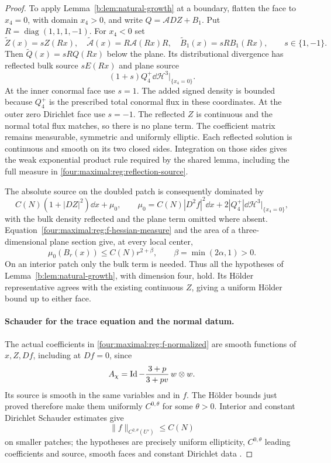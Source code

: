 \begin{proof}
To apply Lemma~\ref{b:lem:natural-growth} at a boundary, flatten the
face to $x_4=0$, with domain $x_4>0$, and write
$Q=\mathcal A DZ+B_1$.  Put $R=\operatorname{diag}(1,1,1,-1)$.
For $x_4<0$ set
\[
 \widetilde Z(x)=sZ(Rx),\quad
 \widetilde{\mathcal A}(x)=R\mathcal A(Rx)R,\quad
 \widetilde B_1(x)=sRB_1(Rx),\qquad s\in\{1,-1\}.
\]
Then $\widetilde Q(x)=sRQ(Rx)$ below the plane.  Its distributional
divergence has reflected bulk source $sE(Rx)$ and plane source
\begin{equation}\label{four:maximal:reg:reflection-source}
 (1+s)Q_4^+\dd\mathcal H^3\big|_{\{x_4=0\}}.
\end{equation}
At the inner conormal face use $s=1$.  The added signed density is
bounded because $Q_4^+$ is the prescribed total conormal flux in
these coordinates.  At the outer zero Dirichlet face use $s=-1$.
The reflected $Z$ is continuous and the normal total flux matches,
so there is no plane term.  The coefficient matrix remains measurable,
symmetric and uniformly elliptic.  Each reflected solution is continuous
and smooth on its two closed sides.  Integration on those sides gives
the weak exponential product rule required by the shared lemma,
including the full measure in \eqref{four:maximal:reg:reflection-source}.

The absolute source on the doubled patch is consequently dominated by
\[
 C(N)(1+|DZ|^2)\dd x+\mu _0,\qquad
 \mu _0=C(N)|D^2f|^2\dd x
          +2|Q_4^+|\dd\mathcal H^3\big|_{\{x_4=0\}},
\]
with the bulk density reflected and the plane term omitted where absent.
Equation~\eqref{four:maximal:reg:f-hessian-measure} and the area of a
three-dimensional plane section give, at every local center,
\[
 \mu _0(B_r(x))\le C(N)r^{2+\beta},\qquad
                         \beta=\min(2\alpha,1)>0.
\]
On an interior patch only the bulk term is needed.  Thus all the
hypotheses of Lemma~\ref{b:lem:natural-growth}, with dimension four,
hold.  Its H\"older representative agrees with the existing continuous
$Z$, giving a uniform H\"older bound up to either face.

\paragraph{Schauder for the trace equation and the normal datum.}
The actual coefficients in \eqref{four:maximal:reg:f-normalized} are smooth
functions of $x,Z,Df$, including at $Df=0$, since
\[
 A_\chi=\operatorname{Id}-\frac{3+p}{3+pv}\,w\otimes w.
\]
Its source is smooth in the same variables and in $f$.  The
H\"older bounds just proved therefore make them uniformly
$C^{0,\theta}$ for some $\theta>0$.  Interior and constant
Dirichlet Schauder estimates give
\begin{equation}\label{four:maximal:reg:f-schauder}
 \|f\|_{C^{2,\theta}(U')}\le C(N)
\end{equation}
on smaller patches; the hypotheses are precisely uniform
ellipticity, $C^{0,\theta}$ leading coefficients and source, smooth
faces and constant Dirichlet data
\cite[Sections~6.1--6.2]{GilbargTrudinger2001}.


\end{proof}
